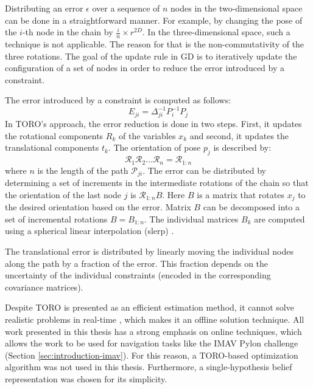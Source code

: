 Distributing an error $\epsilon$ over a sequence of $n$ nodes in the two-dimensional space can be done in a straightforward manner.
For example, by changing the pose of the $i$-th node in the chain by $\frac{i}{n} \times r^{2D}$.
In the three-dimensional space, such a technique is not applicable.
The reason for that is the non-commutativity of the three rotations.
The goal of the update rule in GD is to iteratively update the configuration of a set of nodes in order to reduce the error introduced by a constraint.

The error introduced by a constraint is computed as follows:
\begin{equation}
E_{ji} = \Delta_{ji}^{-1} P_i^{-1} P_j
\end{equation}
In TORO's approach, the error reduction is done in two steps.
First, it updates the rotational components $R_k$ of the variables $x_k$ and second, it updates the translational components $t_k$.
The orientation of pose $p_j$ is described by:
\begin{equation}
\mathcal{R}_1\mathcal{R}_2 \hdots \mathcal{R}_n = \mathcal{R}_{1:n}
\end{equation}
where $n$ is the length of the path $\mathcal{P}_{ji}$.
The error can be distributed by determining a set of increments in the intermediate rotations of the chain so that the orientation of the last node $j$ is $\mathcal{R}_{1:n} B$. Here $B$ is a matrix that rotates $x_j$ to the desired orientation based on the error.
Matrix $B$ can be decomposed into a set of incremental rotations $B = B_{1:n}$.
The individual matrices $B_k$ are computed using a spherical linear interpolation (slerp) \cite{barrera2004incremental}.

The translational error is distributed by linearly moving the individual nodes along the path by a fraction of the error.
This fraction depends on the uncertainty of the individual constraints (encoded in the corresponding covariance matrices).

Despite TORO is presented as an efficient estimation method, it cannot solve realistic problems in real-time \cite{grisetti2007efficient}, which makes it an offline solution technique.
All work presented in this thesis has a strong emphasis on online techniques, which allows the work to be used for navigation tasks like the IMAV Pylon challenge (Section \ref{sec:introduction-imav}).
For this reason, a TORO-based optimization algorithm was not used in this thesis.
Furthermore, a single-hypothesis belief representation was chosen for its simplicity.


